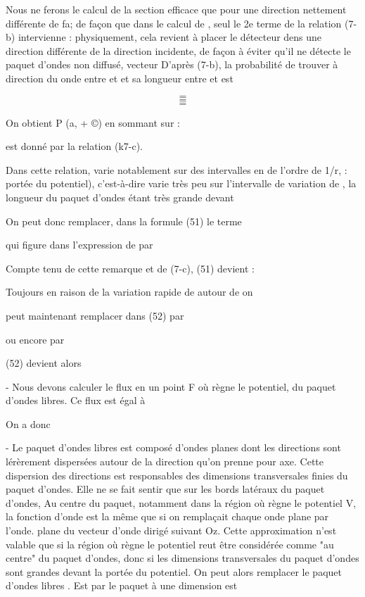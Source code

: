 Nous ne ferons le calcul de la section efficace que pour une direction  nettement
différente de fa; de façon que dans le calcul de
, seul le 2e terme de la relation (7-b) intervienne : physiquement,
cela revient à placer le détecteur dens une direction différente de la direction
incidente, de façon à éviter qu'il ne détecte le paquet d'ondes non diffusé,
vecteur D'après (7-b), la probabilité de trouver à  direction du
onde entre  et  et sa longueur entre  et  est


\[
\tag{51}=
\]
\[
\tag{52}=
\]
\[
\tag{53}=
\]

On obtient P (a, + ©) en sommant sur  :

  est donné par la relation (k7-c).

Dans cette relation, varie notablement sur des intervalles en  de l'ordre
de 1/r,  : portée du potentiel), c'est-à-dire
varie très peu sur l'intervalle de variation de , la longueur
du paquet d'ondes étant très grande devant 

On peut donc remplacer, dans la formule (51) le terme

 qui figure dans l'expression de  par

Compte tenu de cette remarque et de (7-c), (51) devient :

Toujours en raison de la variation rapide de  autour de  on

peut maintenant remplacer dans (52)  par

ou encore par

(52) devient alors


- Nous devons calculer le flux en un point F où règne le potentiel, du
paquet d'ondes libres. Ce flux  est égal à 

On a donc

- Le paquet d'ondes libres  est composé d'ondes planes  dont
les directions sont lérèrement dispersées autour de la direction  qu'on
prenne pour axe. Cette dispersion des directions est responsables des
dimensions transversales finies du paquet d'ondes. Elle ne se fait sentir
que sur les bords latéraux du paquet d'ondes, Au centre du paquet, notamment
dans la région où règne le potentiel V, la fonction d'onde est la
même que si on remplaçait chaque onde plane  par l'onde. plane du
vecteur d'onde  dirigé suivant Oz. Cette approximation n'est valable que
si la région où règne le potentiel reut être considérée comme "au centre"
du paquet d'ondes, donc si les dimensions transversales du paquet d'ondes
sont grandes devant la portée du potentiel. On peut alors remplacer le paquet d'ondes libres . Est
par le paquet à une dimension est

